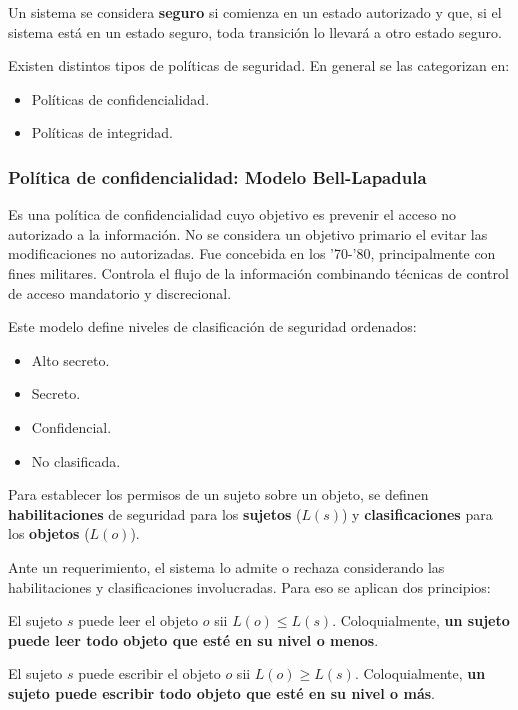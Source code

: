 \documentclass[]{article}
\begin{document}
Un sistema se considera \textbf{seguro} si comienza en un estado autorizado y que, si el sistema está en un estado seguro, toda transición lo llevará a otro estado seguro.

Existen distintos tipos de políticas de seguridad. En general se las categorizan en:

\begin{itemize}
	\item Políticas de confidencialidad.
	\item Políticas de integridad.
\end{itemize}


\subsubsection{Política de confidencialidad: Modelo Bell-Lapadula}
Es una política de confidencialidad cuyo objetivo es prevenir el acceso no autorizado a la información. No se considera un objetivo primario el evitar las modificaciones no autorizadas. Fue concebida en los '70-'80, principalmente con fines militares. Controla el flujo de la información combinando técnicas de control de acceso mandatorio y discrecional.

Este modelo define niveles de clasificación de seguridad ordenados:
\begin{itemize}
	\item Alto secreto.
	\item Secreto.
	\item Confidencial.
	\item No clasificada.
\end{itemize}

Para establecer los permisos de un sujeto sobre un objeto, se definen \textbf{habilitaciones} de seguridad para los \textbf{sujetos} ($L(s)$) y \textbf{clasificaciones} para los \textbf{objetos} ($L(o)$).

Ante un requerimiento, el sistema lo admite o rechaza considerando las habilitaciones y clasificaciones involucradas. Para eso se aplican dos principios:

El sujeto $s$ puede leer el objeto $o$ sii $L(o) \leq L(s)$. Coloquialmente, \textbf{un sujeto puede leer todo objeto que esté en su nivel o menos}.

El sujeto $s$ puede escribir el objeto $o$ sii $L(o) \geq L(s)$. Coloquialmente, \textbf{un sujeto puede escribir todo objeto que esté en su nivel o más}.
\end{document}
